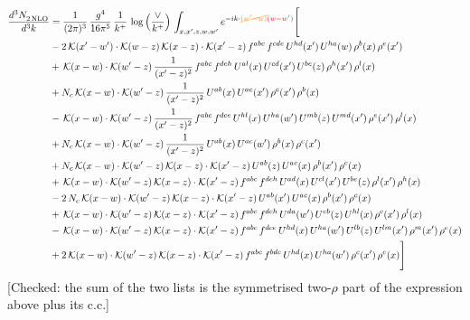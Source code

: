 \documentclass[9pt]{article}
\numberwithin{equation}{section}
\begin{document}
\begin{align}
    \frac{d^{3}N_{2\,\rm NLO}^{\rm}}{d^{3}k}  & = \frac{1}{(2\pi)^{3}}\,\frac{g^{4}}{16\pi^{5}}\,\frac{1}{k^{+}}\,\log{\left(\frac{\vee}{k^{+}}\right)}\, \int_{x,x',z,w,w'}e^{-ik\cdot{\color{orange}\cancel{(w'-w)}}{\color{red}(w-w')}}\Bigg[\notag\\ & -2\,\mathcal{K}(x'-w')\cdot\mathcal{K}(w-z)\,\mathcal{K}(x-z)\cdot\mathcal{K}(x'-z)\,f^{abc}\,f^{cde}\,U^{hd}(x')\,U^{ha}(w)\,\rho^{b}(x)\,\rho^{e}(x')\notag \\ 
&+\,\mathcal{K}(x-w)\cdot\mathcal{K}(w'-z)\,\frac{1}{(x'-z)^{2}}\,f^{abc}\,f^{deh}\,U^{al}(x)\,U^{cd}(x')\,U^{be}(z)\,\rho^{h}(x')\,\rho^{l}(x)\notag \\ 
&+N_{c}\,\mathcal{K}(x-w)\cdot\mathcal{K}(w'-z)\,\frac{1}{(x'-z)^{2}}\,U^{ab}(x)\,U^{ac}(x')\,\rho^{c}(x')\,\rho^{b}(x)\notag \\ 
&-\,\mathcal{K}(x-w)\cdot\mathcal{K}(w'-z)\,\frac{1}{(x'-z)^{2}}\,f^{abc}\,f^{dce}\,U^{hl}(x)\,U^{ha}(w')\,U^{mb}(z)\,U^{md}(x')\,\rho^{e}(x')\,\rho^{l}(x)\notag \\ & +N_{c}\,\mathcal{K}(x-w)\cdot\mathcal{K}(w'-z)\,\frac{1}{(x'-z)^{2}}\,U^{ab}(x)\,U^{ac}(w')\,\rho^{b}(x)\,\rho^{c}(x')\notag \\ 
&+N_{c}\,\mathcal{K}(x-w)\cdot\mathcal{K}(w'-z)\,\mathcal{K}(x-z)\cdot\mathcal{K}(x'-z)\,U^{ab}(z)\,U^{ac}(x)\,\rho^{b}(x')\,\rho^{c}(x)\notag \\ 
&+\,\mathcal{K}(x-w)\cdot\mathcal{K}(w'-z)\,\mathcal{K}(x-z)\cdot\mathcal{K}(x'-z)\,f^{abc}\,f^{deh}\,U^{ad}(x)\,U^{cl}(x')\,U^{be}(z)\,\rho^{l}(x')\,\rho^{h}(x)\notag \\ 
&-2\,N_{c}\,\mathcal{K}(x-w)\cdot\mathcal{K}(w'-z)\,\mathcal{K}(x-z)\cdot\mathcal{K}(x'-z)\,U^{ab}(x')\,U^{ac}(x)\,\rho^{b}(x')\,\rho^{c}(x)\notag \\ 
&+\,\mathcal{K}(x-w)\cdot\mathcal{K}(w'-z)\,\mathcal{K}(x-z)\cdot\mathcal{K}(x'-z)\,f^{abc}\,f^{deh}\,U^{da}(w')\,U^{eb}(z)\,U^{hl}(x)\,\rho^{c}(x')\,\rho^{l}(x)\notag \\ 
&-\,\mathcal{K}(x-w)\cdot\mathcal{K}(w'-z)\,\mathcal{K}(x-z)\cdot\mathcal{K}(x'-z)\,f^{abc}\,f^{dce}\,U^{hd}(x)\,U^{ha}(w')\,U^{lb}(z)\,U^{lm}(x')\,\rho^{m}(x')\,\rho^{e}(x)\notag \\ 
&+2\,\mathcal{K}(x-w)\cdot\mathcal{K}(w'-z)\,\mathcal{K}(x-z)\cdot\mathcal{K}(x'-z)\,f^{abc}\,f^{bde}\,U^{hd}(x)\,U^{ha}(w')\,\rho^{c}(x')\,\rho^{e}(x)\Bigg]
\end{align} {\color{red}[Checked: the sum of the two lists is the symmetrised two-$\rho$ part of the expression above plus its c.c.]}\par\noindent 
\end{document}
